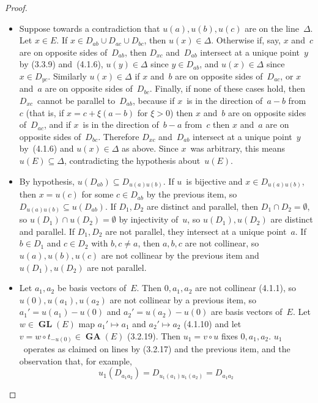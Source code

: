 \documentclass[letterpaper,12pt]{article}
\newcommand{\union}{\cup}
\newcommand{\sect}{\cap}
\newcommand{\after}{\circ}
\DeclareMathOperator{\GL}{\mathbf{GL}}
\DeclareMathOperator{\GA}{\mathbf{GA}}
\theoremstyle{definition}
\theoremstyle{remark}
\begin{document}
\begin{proof}\
\begin{itemize}[itemsep=0pt]
\item Suppose towards a contradiction that \(u(a),u(b),u(c)\) are on the line~\(\Delta\). Let \(x\in E\). If \(x\in D_{ab}\union D_{ac}\union D_{bc}\), then \(u(x)\in\Delta\). Otherwise if, say, \(x\) and~\(c\) are on opposite sides of~\(D_{ab}\), then \(D_{xc}\) and~\(D_{ab}\) intersect at a unique point~\(y\) by (3.3.9) and~(4.1.6), \(u(y)\in\Delta\) since \(y\in D_{ab}\), and \(u(x)\in\Delta\) since \(x\in D_{yc}\). Similarly \(u(x)\in\Delta\) if \(x\) and~\(b\) are on opposite sides of~\(D_{ac}\), or \(x\) and~\(a\) are on opposite sides of~\(D_{bc}\). Finally, if none of these cases hold, then \(D_{xc}\)~cannot be parallel to~\(D_{ab}\), because if \(x\)~is in the direction of~\(a-b\) from~\(c\) (that is, if \(x=c+\xi(a-b)\) for \(\xi>0\)) then \(x\) and~\(b\) are on opposite sides of~\(D_{ac}\), and if \(x\)~is in the direction of~\(b-a\) from~\(c\) then \(x\) and~\(a\) are on opposite sides of~\(D_{bc}\). Therefore \(D_{xc}\) and~\(D_{ab}\) intersect at a unique point~\(y\) by~(4.1.6) and \(u(x)\in\Delta\) as above. Since \(x\)~was arbitrary, this means \(u(E)\subseteq\Delta\), contradicting the hypothesis about~\(u(E)\).

\item By hypothesis, \(u(D_{ab})\subseteq D_{u(a)u(b)}\). If \(u\)~is bijective and \(x\in D_{u(a)u(b)}\), then \(x=u(c)\) for some \(c\in D_{ab}\) by the previous item, so \(D_{u(a)u(b)}\subseteq u(D_{ab})\). If \(D_1,D_2\) are distinct and parallel, then \(D_1\sect D_2=\emptyset\), so \(u(D_1)\sect u(D_2)=\emptyset\) by injectivity of~\(u\), so \(u(D_1),u(D_2)\) are distinct and parallel. If \(D_1,D_2\) are not parallel, they intersect at a unique point~\(a\). If \(b\in D_1\) and \(c\in D_2\) with \(b,c\ne a\), then \(a,b,c\) are not collinear, so \(u(a),u(b),u(c)\) are not collinear by the previous item and \(u(D_1),u(D_2)\) are not parallel.

\item Let \(a_1,a_2\) be basis vectors of~\(E\). Then \(0,a_1,a_2\) are not collinear (4.1.1), so \(u(0),u(a_1),u(a_2)\) are not collinear by a previous item, so \(a_1'=u(a_1)-u(0)\) and \(a_2'=u(a_2)-u(0)\) are basis vectors of~\(E\). Let \(w\in\GL(E)\) map \(a_1'\mapsto a_1\) and \(a_2'\mapsto a_2\) (4.1.10) and let \(v=w\after t_{-u(0)}\in\GA(E)\) (3.2.19). Then \(u_1=v\after u\) fixes \(0,a_1,a_2\). \(u_1\)~operates as claimed on lines by (3.2.17) and the previous item, and the observation that, for example,
\[u_1(D_{a_1a_2})=D_{u_1(a_1)u_1(a_2)}=D_{a_1a_2}\]


\end{itemize}
\end{proof}
\end{document}
